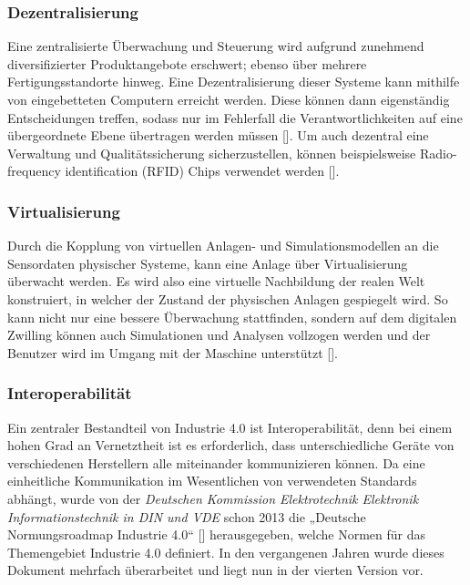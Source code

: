 \subsubsection{Dezentralisierung}

Eine zentralisierte Überwachung und Steuerung wird aufgrund zunehmend diversifizierter Produktangebote erschwert; ebenso über mehrere Fertigungsstandorte hinweg. Eine Dezentralisierung dieser Systeme kann mithilfe von eingebetteten Computern erreicht werden. Diese können dann eigenständig Entscheidungen treffen, sodass nur im Fehlerfall die Verantwortlichkeiten auf eine übergeordnete Ebene übertragen werden müssen [\cite{industrie40dezentral}]. Um auch dezentral eine Verwaltung und Qualitätssicherung sicherzustellen, können beispielsweise Radio-frequency identification (RFID) Chips verwendet werden [\cite{industrie40design}].

\subsubsection{Virtualisierung}

Durch die Kopplung von virtuellen Anlagen- und Simulationsmodellen an die Sensordaten physischer Systeme, kann eine Anlage über Virtualisierung überwacht werden. Es wird also eine virtuelle Nachbildung der realen Welt konstruiert, in welcher der Zustand der physischen Anlagen gespiegelt wird. So kann nicht nur eine bessere Überwachung stattfinden, sondern auf dem digitalen Zwilling können auch Simulationen und Analysen vollzogen werden und der Benutzer wird im Umgang mit der Maschine unterstützt [\cite{digitalerZwilling}].

\subsubsection{Interoperabilität}

Ein zentraler Bestandteil von Industrie 4.0 ist Interoperabilität, denn bei einem hohen Grad an Vernetztheit ist es erforderlich, dass unterschiedliche Geräte von verschiedenen Herstellern alle miteinander kommunizieren können. Da eine einheitliche Kommunikation im Wesentlichen von verwendeten Standards abhängt, wurde von der \textit{Deutschen Kommission Elektrotechnik Elektronik Informationstechnik in DIN und VDE} schon 2013 die „Deutsche Normungsroadmap Industrie 4.0“ [\cite{industrie40norm}] herausgegeben, welche Normen für das Themengebiet Industrie 4.0 definiert. In den vergangenen Jahren wurde dieses Dokument mehrfach überarbeitet und liegt nun in der vierten Version vor.

